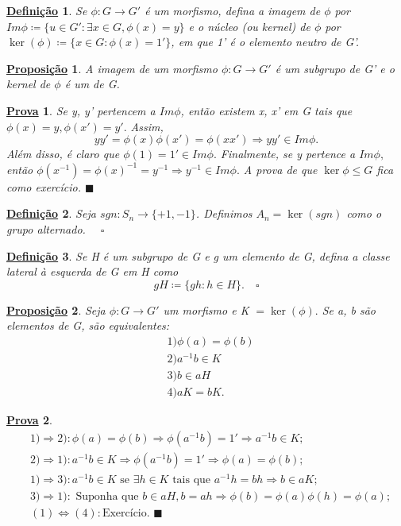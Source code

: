 \documentclass{article}
\newtheorem*{def*}{\underline{Defini\c c\~ao}}
\newtheorem*{prop*}{\underline{Proposi\c c\~ao}}
\newtheorem*{proof*}{\underline{Prova}}
\renewcommand\qedsymbol{$\blacksquare$}
\begin{document}
\begin{def*}
  Se $\phi:G\rightarrow G'$ \'e um morfismo, defina a imagem de $\phi$ por $Im \phi\coloneqq\{u\in G': \exists x\in G, \phi(x)=y\}$ 
  e o n\'ucleo (ou kernel) de $\phi$ por $\ker{(\phi)}\coloneqq\{x\in G: \phi(x) = 1'\} $, em que 1' \'e o elemento neutro de G'.  
\end{def*}
\begin{prop*}
  A imagem de um morfismo $\phi:G\rightarrow G'$ \'e um subgrupo de G' e o kernel de $\phi$ \'e um de G.
\end{prop*}
\begin{proof*}
  Se y, y' pertencem a $Im\phi$, ent\~ao existem x, x' em G tais que $\phi(x) = y, \phi(x')=y'.$ Assim, 
  $$
    yy' = \phi(x)\phi(x') = \phi(xx') \Rightarrow yy'\in Im\phi.
  $$
  Al\'em disso, \'e claro que $\phi(1) = 1'\in Im\phi.$ Finalmente, se y pertence a $Im \phi,$ ent\~ao
 $\phi(x^{-1}) = \phi(x)^{-1} = y^{-1} \Rightarrow y^{-1}\in Im \phi.$ A prova de que $\ker\phi\leq{G}$ fica como
 exerc\'icio. \qedsymbol
\end{proof*}
\begin{def*}
  Seja $sgn:S_{n}\rightarrow \{+1, -1\}$. Definimos $A_{n} = \ker{(sgn)}$ como o grupo alternado. $\quad\square$
\end{def*}
\begin{def*}
  Se H \'e um subgrupo de G e g um elemento de G, defina a classe lateral \`a esquerda de G em H como
  $$
    gH\coloneqq \{gh: h\in H\}.\quad\square
  $$
\end{def*}
\begin{prop*}
  Seja $\phi:G\rightarrow G'$ um morfismo e K $= \ker{(\phi)}.$ Se a, b s\~ao elementos de G, s\~ao equivalentes:
 \begin{align*}
   &1) \phi(a) = \phi(b)\\
   &2) a^{-1}b\in K\\
   &3) b\in aH\\
   &4) aK = bK.
 \end{align*}
\end{prop*}
\begin{proof*}
  \begin{align*}
  &1)\Rightarrow2): \phi(a) = \phi(b) \Rightarrow \phi(a^{-1}b) = 1' \Rightarrow a^{-1}b\in K;\\ 
  &2)\Rightarrow1): a^{-1}b\in K \Rightarrow \phi(a^{-1}b) = 1' \Rightarrow \phi(a)=\phi(b);\\
  &1)\Rightarrow3): a^{-1}b\in K \text{ se } \exists h\in K \text{ tais que } a^{-1}h = bh \Rightarrow b\in aK;\\
  &3)\Rightarrow1): \text{ Suponha que }b\in aH, b = ah \Rightarrow \phi(b) = \phi(a)\phi(h) = \phi(a);\\
  &(1)\Longleftrightarrow(4): \text{Exerc\'icio. \qedsymbol}
  \end{align*}
\end{proof*}
\newpage
\end{document}

